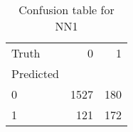 \begin{table}[h!]
\caption{Confusion table for NN1}
\label{tab:NN1}
\begin{tabular}{lrr}
\toprule
Truth & 0 & 1 \\
Predicted &  &  \\
\midrule
0 & 1527 & 180 \\
1 & 121 & 172 \\
\bottomrule
\end{tabular}
\end{table}
